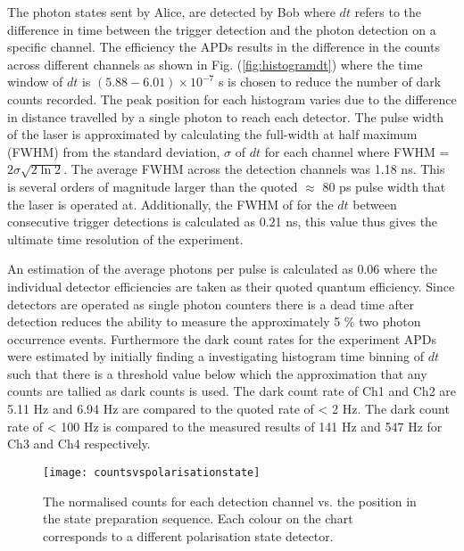 The photon states sent by Alice, are detected by Bob where $dt$ refers to the difference in time between the trigger detection and the photon detection on a specific channel. The efficiency the APDs results in the difference in the counts across different channels as shown in Fig. (\ref{fig:histogramdt}) where the time window of $dt$ is $(5.88-6.01)\times10^{-7}$ s is chosen to reduce the number of dark counts recorded. The peak position for each histogram varies due to the difference in distance travelled by a single photon to reach each detector. The pulse width of the laser is approximated by calculating the full-width at half maximum (FWHM) from the standard deviation, $\sigma$ of $dt$ for each channel where FWHM = $2\sigma\sqrt{2\ln{2}}$. The average FWHM across the detection channels was 1.18 ns. This is several orders of magnitude larger than the quoted $\approx$ 80 ps pulse width that the laser is operated at. Additionally, the FWHM of for the $dt$ between consecutive trigger detections is calculated as 0.21 ns, this value thus gives the ultimate time resolution of the experiment. 

An estimation of the average photons per pulse is calculated as 0.06 where the individual detector efficiencies are taken as their quoted quantum efficiency. Since detectors are operated as single photon counters there is a dead time after detection reduces the ability to measure the approximately 5 $\%$ two photon occurrence events. Furthermore the dark count rates for the experiment APDs were estimated by initially finding a investigating histogram time binning of $dt$ such that there is a threshold value below which the approximation that any counts are tallied as dark counts is used. The dark count rate of Ch1 and Ch2 are 5.11 Hz and 6.94 Hz are compared to the quoted rate of < 2 Hz. The dark count rate of < 100 Hz is compared to the measured results of 141 Hz and 547 Hz for Ch3 and Ch4 respectively.       

\begin{figure}[t]
\centering
\texttt{[image: countsvspolarisationstate]}
\caption{\label{fig:countsvspolarisationstate}The normalised counts for each detection channel vs. the position in the state preparation sequence. Each colour on the chart corresponds to a different polarisation state detector.}
\end{figure} 

